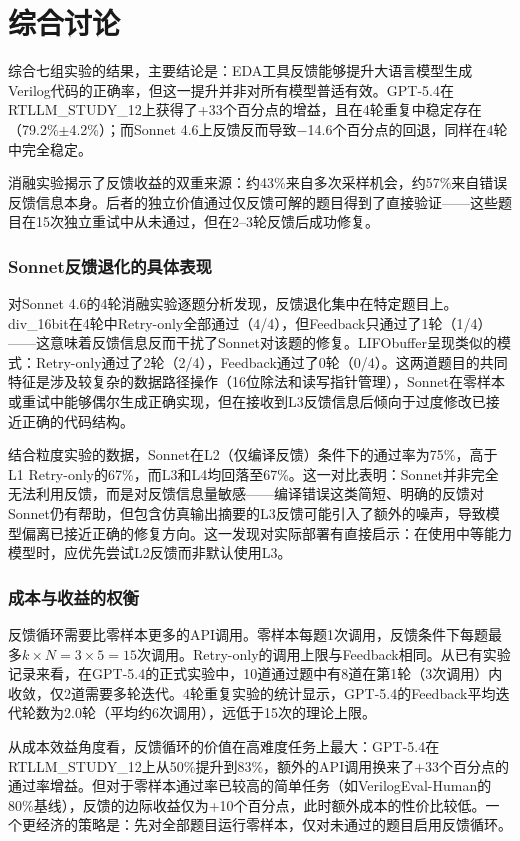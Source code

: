 \section{综合讨论}

综合七组实验的结果，主要结论是：EDA工具反馈能够提升大语言模型生成Verilog代码的正确率，但这一提升并非对所有模型普适有效。GPT-5.4在RTLLM\_STUDY\_12上获得了+33个百分点的增益，且在4轮重复中稳定存在（79.2\%$\pm$4.2\%）；而Sonnet 4.6上反馈反而导致$-$14.6个百分点的回退，同样在4轮中完全稳定。

消融实验揭示了反馈收益的双重来源：约43\%来自多次采样机会，约57\%来自错误反馈信息本身。后者的独立价值通过仅反馈可解的题目得到了直接验证——这些题目在15次独立重试中从未通过，但在2--3轮反馈后成功修复。

\subsubsection*{Sonnet反馈退化的具体表现}
对Sonnet 4.6的4轮消融实验逐题分析发现，反馈退化集中在特定题目上。div\_16bit在4轮中Retry-only全部通过（4/4），但Feedback只通过了1轮（1/4）——这意味着反馈信息反而干扰了Sonnet对该题的修复。LIFObuffer呈现类似的模式：Retry-only通过了2轮（2/4），Feedback通过了0轮（0/4）。这两道题目的共同特征是涉及较复杂的数据路径操作（16位除法和读写指针管理），Sonnet在零样本或重试中能够偶尔生成正确实现，但在接收到L3反馈信息后倾向于过度修改已接近正确的代码结构。

结合粒度实验的数据，Sonnet在L2（仅编译反馈）条件下的通过率为75\%，高于L1 Retry-only的67\%，而L3和L4均回落至67\%。这一对比表明：Sonnet并非完全无法利用反馈，而是对反馈信息量敏感——编译错误这类简短、明确的反馈对Sonnet仍有帮助，但包含仿真输出摘要的L3反馈可能引入了额外的噪声，导致模型偏离已接近正确的修复方向。这一发现对实际部署有直接启示：在使用中等能力模型时，应优先尝试L2反馈而非默认使用L3。

\subsubsection*{成本与收益的权衡}
反馈循环需要比零样本更多的API调用。零样本每题1次调用，反馈条件下每题最多$k \times N = 3 \times 5 = 15$次调用。Retry-only的调用上限与Feedback相同。从已有实验记录来看，在GPT-5.4的正式实验中，10道通过题中有8道在第1轮（3次调用）内收敛，仅2道需要多轮迭代。4轮重复实验的统计显示，GPT-5.4的Feedback平均迭代轮数为2.0轮（平均约6次调用），远低于15次的理论上限。

从成本效益角度看，反馈循环的价值在高难度任务上最大：GPT-5.4在RTLLM\_STUDY\_12上从50\%提升到83\%，额外的API调用换来了+33个百分点的通过率增益。但对于零样本通过率已较高的简单任务（如VerilogEval-Human的80\%基线），反馈的边际收益仅为+10个百分点，此时额外成本的性价比较低。一个更经济的策略是：先对全部题目运行零样本，仅对未通过的题目启用反馈循环。


